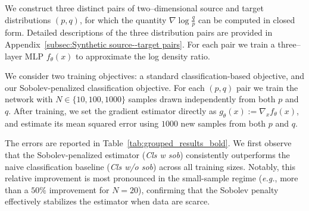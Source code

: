 \documentclass[11pt]{article}
\theoremstyle{plain}
\theoremstyle{definition}
\theoremstyle{remark}
\begin{document}
We construct three distinct pairs of two–dimensional source and target
distributions \((p,q)\), for which the quantity
\(\nabla \log \tfrac{q}{p}\) can be computed in closed form. Detailed descriptions of the three distribution pairs are provided in Appendix~\ref{subsec:Synthetic source--target pairs}.
For each pair we train a three–layer MLP \(f_\theta(x)\) to approximate
the log density ratio.

We consider two training objectives: a standard
classification-based objective,
and our Sobolev-penalized classification objective.
For each \((p,q)\) pair we train the network with
\(N \in \{10, 100, 1000\}\) samples drawn independently from both
\(p\) and \(q\).
After training, we set the gradient estimator directly as
\({g}_\theta(x):= \nabla_x f_\theta(x)\),
and estimate its mean squared error using \(1000\) new samples from both \(p\) and \(q\).


The errors are reported in Table~\ref{tab:grouped_results_bold}.
We first observe that the Sobolev-penalized estimator (\textit{Cls w sob}) consistently outperforms the naive classification baseline (\textit{Cls w/o sob}) across all training sizes.
Notably, this relative improvement is most pronounced in the small-sample regime
({\it e.g.}, more than a $50\%$ improvement for $N=20$), confirming that the Sobolev penalty effectively stabilizes the estimator when data are scarce.
\end{document}

